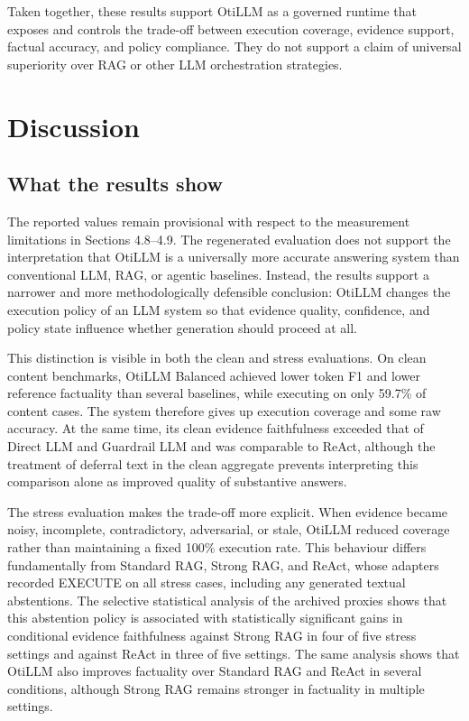 \documentclass[manuscript, screen, review]{jair}
\begin{document}
Taken together, these results support OtiLLM as a governed runtime that exposes
and controls the trade-off between execution coverage, evidence support, factual
accuracy, and policy compliance. They do not support a claim of universal
superiority over RAG or other LLM orchestration strategies.


\section{Discussion}
\subsection{What the results show}

The reported values remain provisional with respect to the measurement limitations in Sections 4.8--4.9. The regenerated evaluation does not support the interpretation that OtiLLM is a universally more accurate answering system than conventional LLM, RAG, or agentic baselines. Instead, the results support a narrower and more methodologically defensible conclusion: OtiLLM changes the execution policy of an LLM system so that evidence quality, confidence, and policy state influence whether generation should proceed at all.

This distinction is visible in both the clean and stress evaluations. On clean content benchmarks, OtiLLM Balanced achieved lower token F1 and lower reference factuality than several baselines, while executing on only 59.7\% of content cases. The system therefore gives up execution coverage and some raw accuracy. At the same time, its clean evidence faithfulness exceeded that of Direct LLM and Guardrail LLM and was comparable to ReAct, although the treatment of deferral text in the clean aggregate prevents interpreting this comparison alone as improved quality of substantive answers.

The stress evaluation makes the trade-off more explicit. When evidence became noisy, incomplete, contradictory, adversarial, or stale, OtiLLM reduced coverage rather than maintaining a fixed 100\% execution rate. This behaviour differs fundamentally from Standard RAG, Strong RAG, and ReAct, whose adapters recorded EXECUTE on all stress cases, including any generated textual abstentions. The selective statistical analysis of the archived proxies shows that this abstention policy is associated with statistically significant gains in conditional evidence faithfulness against Strong RAG in four of five stress settings and against ReAct in three of five settings. The same analysis shows that OtiLLM also improves factuality over Standard RAG and ReAct in several conditions, although Strong RAG remains stronger in factuality in multiple settings.
\end{document}
